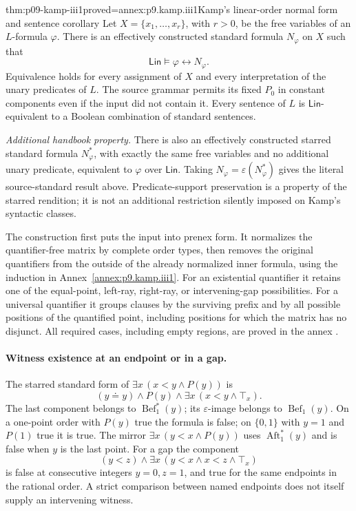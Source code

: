 \begin{hbtheorem}{thm:p09-kamp-iii1}{proved=annex:p9.kamp.iii1}{Kamp's linear-order normal form and sentence corollary}
Let \(X=\{x_1,\ldots,x_r\}\), with \(r>0\), be the free variables of
an \(L\)-formula \(\varphi\).  There is an effectively constructed
standard formula \(N_\varphi\) on \(X\) such that
\[
 \mathsf{Lin}\models\varphi\longleftrightarrow N_\varphi.
\]
Equivalence holds for every assignment of \(X\) and every interpretation
of the unary predicates of \(L\).  The source grammar permits its fixed
\(P_0\) in constant components even if the input did not contain it.
Every sentence of \(L\) is \(\mathsf{Lin}\)-equivalent to a Boolean
combination of standard sentences.

\emph{Additional handbook property.}  There is also an effectively
constructed starred standard formula \(N^*_{\varphi}\), with exactly the
same free variables and no additional unary predicate, equivalent to
\(\varphi\) over \(\mathsf{Lin}\).  Taking
\(N_{\varphi}=\varepsilon(N^*_{\varphi})\) gives the literal
source-standard result above.  Predicate-support preservation is a property
of the starred rendition; it is not an additional restriction silently
imposed on Kamp's syntactic classes.

The construction first puts the input into prenex form.  It normalizes the
quantifier-free matrix by complete order types, then removes the original
quantifiers from the outside of the already normalized inner formula, using
the induction in Annex~\ref{annex:p9.kamp.iii1}.  For an existential
quantifier it retains one of the equal-point, left-ray, right-ray, or
intervening-gap possibilities.  For a universal quantifier it groups clauses
by the surviving prefix and by all possible positions of the quantified
point, including positions for which the matrix has no disjunct.  All
required cases, including empty regions, are proved in the annex
\cite[ch.~III, thm.~1 and cor.~1, pp.~48--56]{Kamp1968}.
\end{hbtheorem}

\paragraph{Witness existence at an endpoint or in a gap.}
The starred standard form of \(\exists x\,(x<y\land P(y))\) is
\[
 (y\doteq y)\land P(y)\land
 \exists x\,(x<y\land\top_x).
\]
The last component belongs to \(\operatorname{Bef}^{*}_1(y)\); its
\(\varepsilon\)-image belongs to \(\operatorname{Bef}_1(y)\).
On a one-point order with \(P(y)\) true the formula is false; on
\(\{0,1\}\) with \(y=1\) and \(P(1)\) true it is true.
The mirror \(\exists x\,(y<x\land P(y))\) uses
\(\operatorname{Aft}^{*}_1(y)\) and is false when \(y\) is the last point.
For a gap the component
\[
 (y<z)\land\exists x\,(y<x\land x<z\land\top_x)
\]
is false at consecutive integers \(y=0,z=1\), and true for the same
endpoints in the rational order.  A strict comparison between named
endpoints does not itself supply an intervening witness.


